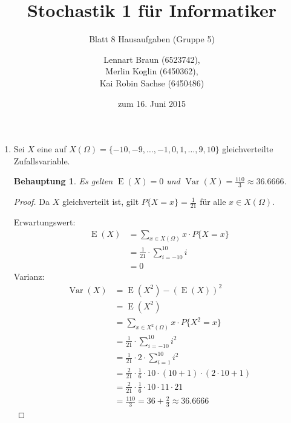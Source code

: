 \documentclass[a4paper]{scrartcl}
\title{Stochastik 1 für Informatiker}
\subtitle{Blatt 8 Hausaufgaben (Gruppe 5)}
\author{
    Lennart Braun (6523742), \\
    Merlin Koglin (6450362), \\
    Kai Robin Sachse (6450486)
}
\date{zum 16. Juni 2015}
\newtheorem*{behaupt}{Behauptung}
\newcommand{\e}{\operatorname{E}}
\newcommand{\var}{\operatorname{Var}}
\begin{document}
\maketitle

\begin{enumerate}[label=\bfseries\arabic*.]
    \item
        Sei $X$ eine auf
        $X(\Omega) = \{-10, -9, \ldots, -1, 0, 1, \ldots, 9, 10\}$
        gleichverteilte Zufallsvariable.
        \begin{behaupt}
            Es gelten $\e(X) = 0$ und
            $\var(X) = \frac{110}{3} \approx \num{36,6666}$.
        \end{behaupt}
        \begin{proof}
            Da $X$ gleichverteilt ist, gilt $P\{X = x\} = \frac{1}{21}$ für alle
            $x \in X(\Omega)$.

            Erwartungswert:
            \begin{equation*}
                \begin{split}
                    \e(X) &= \sum_{x \in X(\Omega)} x \cdot P\{X = x\} \\
                          &= \frac{1}{21} \cdot \sum_{i=-10}^{10} i \\
                          &= 0
                \end{split}
            \end{equation*}
            Varianz:
            \begin{equation*}
                \begin{split}
                    \var(X) &= \e(X^2) - (\e(X))^2 \\
                            &= \e(X^2) \\
                            &= \sum_{x \in X^2(\Omega)} x \cdot P\{X^2 = x\} \\
                            &= \frac{1}{21} \cdot \sum_{i=-10}^{10} i^2 \\
                            &= \frac{1}{21} \cdot 2 \cdot \sum_{i=1}^{10} i^2 \\
                            &= \frac{2}{21} \cdot \frac{1}{6} \cdot 10 \cdot
                               (10 + 1) \cdot (2 \cdot 10 + 1) \\
                            &= \frac{2}{21} \cdot \frac{1}{6} \cdot 10 \cdot 11
                               \cdot 21 \\
                            &= \frac{110}{3} = 36 + \frac{2}{3}
                               \approx \num{36,6666}
                \end{split}
            \end{equation*}
        \end{proof}


\end{enumerate}
\end{document}
